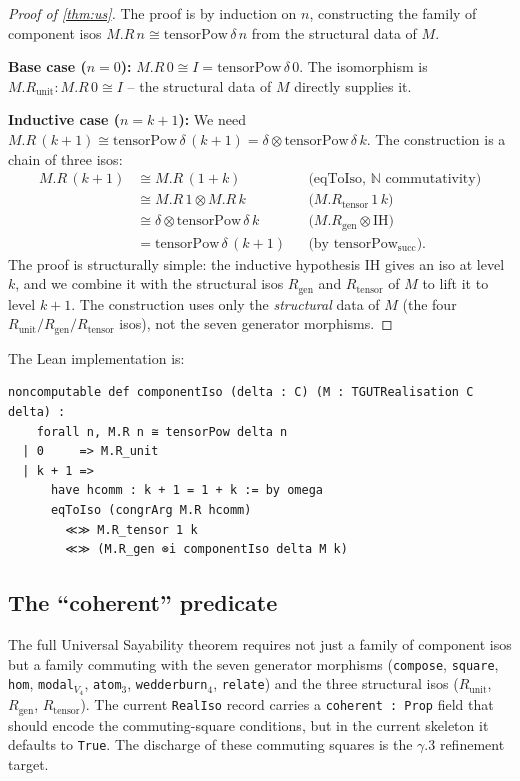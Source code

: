 \documentclass[11pt,a4paper]{article}
\theoremstyle{plain}
\theoremstyle{definition}
\theoremstyle{remark}
\newcommand{\N}{\mathbb{N}}
\newcommand{\tensorPow}{\mathrm{tensorPow}}
\begin{document}
\begin{proof}[Proof of \cref{thm:us}]
The proof is by induction on $n$, constructing the family of component isos $M.R\,n \cong \tensorPow\,\delta\,n$ from the structural data of $M$.

\textbf{Base case ($n = 0$):} $M.R\,0 \cong I = \tensorPow\,\delta\,0$. The isomorphism is $M.R_{\mathrm{unit}} : M.R\,0 \cong I$ -- the structural data of $M$ directly supplies it.

\textbf{Inductive case ($n = k + 1$):} We need $M.R\,(k+1) \cong \tensorPow\,\delta\,(k+1) = \delta \otimes \tensorPow\,\delta\,k$. The construction is a chain of three isos:
\begin{align*}
M.R\,(k+1)
 &\cong M.R\,(1+k) && \text{(eqToIso, $\N$ commutativity)} \\
 &\cong M.R\,1 \otimes M.R\,k && \text{($M.R_{\mathrm{tensor}}\,1\,k$)} \\
 &\cong \delta \otimes \tensorPow\,\delta\,k && \text{($M.R_{\mathrm{gen}} \otimes \mathrm{IH}$)} \\
 &= \tensorPow\,\delta\,(k+1) && \text{(by $\tensorPow_{\mathrm{succ}}$).}
\end{align*}
The proof is structurally simple: the inductive hypothesis IH gives an iso at level $k$, and we combine it with the structural isos $R_{\mathrm{gen}}$ and $R_{\mathrm{tensor}}$ of $M$ to lift it to level $k+1$. The construction uses only the \emph{structural} data of $M$ (the four $R_{\mathrm{unit}}/R_{\mathrm{gen}}/R_{\mathrm{tensor}}$ isos), not the seven generator morphisms.
\end{proof}

The Lean implementation is:

\begin{lstlisting}[language=Lean]
noncomputable def componentIso (delta : C) (M : TGUTRealisation C delta) :
    forall n, M.R n ≅ tensorPow delta n
  | 0     => M.R_unit
  | k + 1 =>
      have hcomm : k + 1 = 1 + k := by omega
      eqToIso (congrArg M.R hcomm)
        ≪≫ M.R_tensor 1 k
        ≪≫ (M.R_gen ⊗i componentIso delta M k)
\end{lstlisting}

\subsection{The ``coherent'' predicate}\label{sec:us:coherent}

The full Universal Sayability theorem requires not just a family of component isos but a family commuting with the seven generator morphisms (\texttt{compose}, \texttt{square}, \texttt{hom}, \texttt{modal}$_{V_4}$, \texttt{atom}$_3$, \texttt{wedderburn}$_4$, \texttt{relate}) and the three structural isos ($R_{\mathrm{unit}}$, $R_{\mathrm{gen}}$, $R_{\mathrm{tensor}}$). The current \texttt{RealIso} record carries a \texttt{coherent : Prop} field that should encode the commuting-square conditions, but in the current skeleton it defaults to \texttt{True}. The discharge of these commuting squares is the $\gamma$.3 refinement target.
\end{document}

